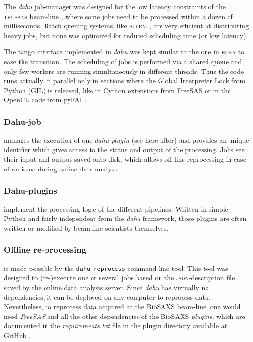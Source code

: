 \documentclass[preprint]{iucr}              %
\begin{document}
The \textit{dahu} job-manager was designed for the low latency constraints of the \textsc{trusaxs} beam-line \cite{id02_2022}, where some jobs need to be processed within a dozen of milliseconds.
Batch queuing systems, like \textsc{slurm} \cite{slurm}, are very efficient at distributing heavy jobs, but none was optimized for reduced scheduling time (or low latency).

The tango interface \cite{tango} implemented in \textit{dahu} was kept similar to the one in \textsc{edna} to ease the transition.
The scheduling of jobs is performed via a shared queue and only few workers are running simultaneously in different threads.
Thus the code runs actually in parallel only in sections where the Global Interpreter Lock from Python (GIL) is released, like in Cython extensions \cite{cython} from FreeSAS or in the OpenCL code from pyFAI \cite{pyFAI_gpu}.



\subsubsection{Dahu-job}
manages the execution of one \textit{dahu-plugin} (see here-after) and provides an unique identifier which gives access to the status and output of the processing.
Jobs see their input and output saved onto disk, which allows off-line reprocessing in case of an issue during online data-analysis.

\subsubsection{Dahu-plugins} implement the processing logic of the different pipelines.
Written in simple Python and fairly independent from the \textit{dahu} framework, those plugins are often written or modified by beam-line scientists themselves.

\subsubsection{Offline re-processing}
is made possible by the \texttt{dahu-reprocess} command-line tool.
This tool was designed to (re-)execute one or several jobs based on the \textsc{json}-description file \cite{json} saved by the online data analysis server. 
Since \textit{dahu} has virtually no dependencies, it can be deployed on any computer to reprocess data. 
Nevertheless, to reprocess data acquired at the BioSAXS beam-line, one would need \textit{FreeSAS} and all the other dependencies of the BioSAXS \textit{plugins}, which are documented in the \textit{requirements.txt} file in the plugin directory available at GitHub \cite{dahu-bm29}.
\end{document}
